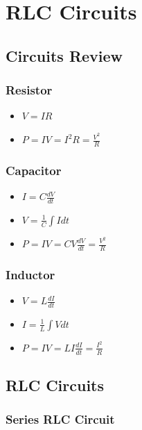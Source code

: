 \section{RLC Circuits}

\subsection{Circuits Review}

\subsubsection{Resistor}

\begin{itemize}
    \item $V = IR$
    \item $P = IV = I^2R = \frac{V^2}{R}$
\end{itemize}

\subsubsection{Capacitor}

\begin{itemize}
    \item $I = C \frac{dV}{dt}$
    \item $V = \frac{1}{C} \int I dt$
    \item $P = IV = CV \frac{dV}{dt} = \frac{V^2}{R}$
\end{itemize}

\subsubsection{Inductor}

\begin{itemize}
    \item $V = L \frac{dI}{dt}$
    \item $I = \frac{1}{L} \int V dt$
    \item $P = IV = LI \frac{dI}{dt} = \frac{I^2}{R}$
\end{itemize}

\subsection{RLC Circuits}

\subsubsection{Series RLC Circuit}


